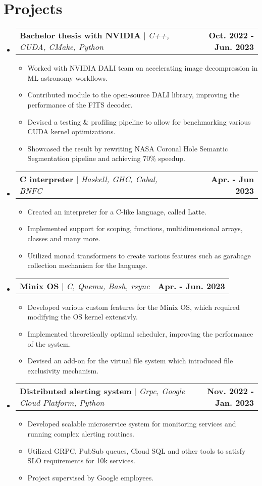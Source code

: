 \documentclass[letterpaper,11pt]{article}
\makeatletter
\newcommand{\resumeItem}[1]{
  \item\small{
    {#1 \vspace{-2pt}}
  }
}
\newcommand{\resumeProjectHeading}[2]{
    \item
    \begin{tabular*}{1.001\textwidth}{l@{\extracolsep{\fill}}r}
      \small#1 & \textbf{\small #2}\\
    \end{tabular*}\vspace{-7pt}
}
\newcommand{\resumeSubHeadingListStart}{\begin{itemize}[leftmargin=0.0in, label={}]}
\newcommand{\resumeSubHeadingListEnd}{\end{itemize}}
\newcommand{\resumeItemListStart}{\begin{itemize}}
\newcommand{\resumeItemListEnd}{\end{itemize}\vspace{-5pt}}
\makeatother
\begin{document}
\section{Projects}
\vspace{-5pt}
\resumeSubHeadingListStart
\resumeProjectHeading
{\textbf{Bachelor thesis with NVIDIA} $|$ \emph{C++, CUDA, CMake, Python}}{Oct. 2022 - Jun. 2023}
\resumeItemListStart
\resumeItem{Worked with NVIDIA DALI team on accelerating image decompression in ML astronomy workflows.}
\resumeItem{Contributed module to the open-source DALI library, improving the performance of the FITS decoder.}
\resumeItem{Devised a testing \& profiling pipeline to allow for benchmarking various CUDA kernel optimizations.}
\resumeItem{Showcased the result by rewriting NASA Coronal Hole Semantic Segmentation pipeline and achieving 70\% speedup.}
\resumeItemListEnd
\vspace{-13pt}
\resumeProjectHeading
{\textbf{C interpreter} $|$ \emph{Haskell, GHC, Cabal, BNFC}}{Apr. - Jun 2023}
\resumeItemListStart
\resumeItem{Created an interpreter for a C-like language, called Latte.}
\resumeItem{Implemented support for scoping, functions, multidimensional arrays, classes and many more.}
\resumeItem{Utilized monad transformers to create various features such as garabage collection mechanism for the language.}
\resumeItemListEnd
\vspace{-13pt}
\resumeProjectHeading
{\textbf{Minix OS} $|$ \emph{C, Quemu, Bash, rsync}}{Apr. - Jun. 2023}
\resumeItemListStart
\resumeItem{Developed various custom features for the Minix OS, which required modifying the OS kernel extensivly.}
\resumeItem{Implemented theoretically optimal scheduler, improving the performance of the system.}
\resumeItem{Devised an add-on for the virtual file system which introduced file exclusivity mechanism.}
\resumeItemListEnd
\vspace{-13pt}
\resumeProjectHeading
{\textbf{Distributed alerting system} $|$ \emph{Grpc, Google Cloud Platform, Python}}{Nov. 2022 - Jan. 2023}
\resumeItemListStart
\resumeItem{Developed scalable microservice system for monitoring services and running complex alerting routines.}
\resumeItem{Utilized GRPC, PubSub queues, Cloud SQL and other tools to satisfy SLO requirements for 10k services.}
\resumeItem{Project supervised by Google employees.}
\resumeItemListEnd
\vspace{-5pt}
\resumeSubHeadingListEnd


\end{document}
